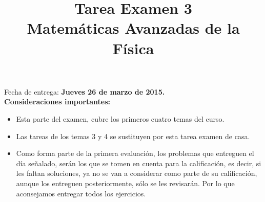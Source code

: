 
\usepackage{enumerate}
\usepackage{pifont}
\renewcommand{\labelitemi}{\ding{43}}
\title{{Tarea Examen 3} \\ {\large Matemáticas Avanzadas de la Física}}
\date{ }

\renewcommand\labelenumii{\theenumi.{\arabic{enumii}}}
\maketitle
\fontsize{14}{14}\selectfont
Fecha de entrega: \textbf{Jueves 26 de marzo de 2015.}
\\
\textbf{Consideraciones importantes:}
\begin{itemize}
\item Esta parte del examen, cubre los primeros cuatro temas del curso.
\item Las tareas de los temas 3 y 4 se sustituyen por esta tarea examen de casa.
\item Como forma parte de la primera evaluación, los problemas que entreguen el día señalado, serán los que se tomen en cuenta para la calificación, es decir, si les faltan soluciones, ya no se van a considerar como parte de su calificación, aunque los entreguen posteriormente, sólo se les revisarán. Por lo que aconsejamos entregar todos los ejercicios.
\end{itemize}

